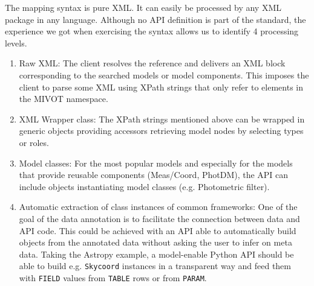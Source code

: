 The mapping syntax is pure XML. It can easily be processed by any XML package in any language.
Although no API definition is part of the standard, the experience we got when exercising the syntax allows us to identify 
4 processing levels.

\begin{enumerate} 
  \item Raw XML: The client resolves the reference and delivers an XML block corresponding to the searched models or model components. 
          This %
          imposes the client to parse some XML using XPath strings that only refer to elements in the MIVOT namespace.
  \item XML Wrapper class: The XPath strings mentioned above can be wrapped in generic objects providing accessors retrieving model nodes by selecting types or roles. 
  \item Model classes: For the most popular models and especially for the models that provide reusable components (Meas/Coord, PhotDM), the API can include objects instantiating model classes (e.g. Photometric filter).
  \item Automatic extraction of class instances of common frameworks: One of the goal of the data annotation is to facilitate the connection between data and API code. This could be achieved with an API able to automatically build objects from the annotated data without asking the user to infer on meta data. Taking the Astropy example, a model-enable Python API should be able to build e.g. \texttt{Skycoord} instances in a transparent way and feed them with \texttt{FIELD} values from \texttt{TABLE} rows or from \texttt{PARAM}.
 \end{enumerate}

